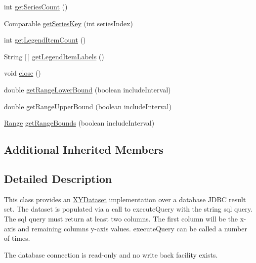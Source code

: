 \begin{DoxyCompactItemize}
\item 
int \mbox{\hyperlink{classorg_1_1jfree_1_1data_1_1jdbc_1_1_j_d_b_c_x_y_dataset_a4950f410e03cd36228f997986cc90423}{get\+Series\+Count}} ()
\item 
Comparable \mbox{\hyperlink{classorg_1_1jfree_1_1data_1_1jdbc_1_1_j_d_b_c_x_y_dataset_a9e0357ec22ce7eeff36ff12c6cfd4d00}{get\+Series\+Key}} (int series\+Index)
\item 
int \mbox{\hyperlink{classorg_1_1jfree_1_1data_1_1jdbc_1_1_j_d_b_c_x_y_dataset_ac31e8c503020d258f3d393bcfa739216}{get\+Legend\+Item\+Count}} ()
\item 
String \mbox{[}$\,$\mbox{]} \mbox{\hyperlink{classorg_1_1jfree_1_1data_1_1jdbc_1_1_j_d_b_c_x_y_dataset_a19141198ff30e4c4e77e1c66c597d936}{get\+Legend\+Item\+Labels}} ()
\item 
void \mbox{\hyperlink{classorg_1_1jfree_1_1data_1_1jdbc_1_1_j_d_b_c_x_y_dataset_af14d34fcc16829d00dc1cae5eb03dfd9}{close}} ()
\item 
double \mbox{\hyperlink{classorg_1_1jfree_1_1data_1_1jdbc_1_1_j_d_b_c_x_y_dataset_a8e50c93deb6df3331819894de3128a64}{get\+Range\+Lower\+Bound}} (boolean include\+Interval)
\item 
double \mbox{\hyperlink{classorg_1_1jfree_1_1data_1_1jdbc_1_1_j_d_b_c_x_y_dataset_a65026164f00394b483b43d73c8313ade}{get\+Range\+Upper\+Bound}} (boolean include\+Interval)
\item 
\mbox{\hyperlink{classorg_1_1jfree_1_1data_1_1_range}{Range}} \mbox{\hyperlink{classorg_1_1jfree_1_1data_1_1jdbc_1_1_j_d_b_c_x_y_dataset_ae0f62e6428726eda9b6d9736c11ac5c6}{get\+Range\+Bounds}} (boolean include\+Interval)
\end{DoxyCompactItemize}
\subsection*{Additional Inherited Members}


\subsection{Detailed Description}
This class provides an \mbox{\hyperlink{}{X\+Y\+Dataset}} implementation over a database J\+D\+BC result set. The dataset is populated via a call to execute\+Query with the string sql query. The sql query must return at least two columns. The first column will be the x-\/axis and remaining columns y-\/axis values. execute\+Query can be called a number of times.

The database connection is read-\/only and no write back facility exists. 

